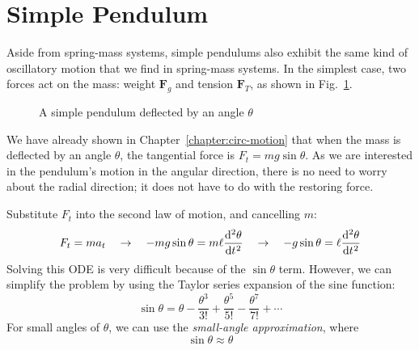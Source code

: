 \section{Simple Pendulum}
Aside from spring-mass systems, simple pendulums also exhibit the same kind
of oscillatory motion that we find in spring-mass systems. In the simplest
case, two forces act on the mass: weight $\bm F_g$ and tension $\bm F_T$, as
shown in Fig.~\ref{fig:pendulum1}.
\begin{figure}[ht]
  \centering 
  \caption{A simple pendulum deflected by an angle $\theta$}
  \label{fig:pendulum1}
\end{figure}
We have already shown in Chapter~\ref{chapter:circ-motion} that when the mass
is deflected by an angle $\theta$, the tangential force is
$F_t=mg\sin\theta$. As we are interested in the pendulum's motion in the
angular direction, there is no need to worry about the radial direction; it
does not have to do with the restoring force.

Substitute $F_t$ into the second law of motion, and cancelling $m$:
\begin{equation}
  F_t=ma_t\quad\rightarrow\quad
  -mg\sin\theta=m\ell\diff[2]{\theta}t
  \quad\rightarrow\quad
  -g\sin\theta=\ell\diff[2]{\theta}t
\end{equation}
Solving this ODE is very difficult because of the $\sin\theta$ term. However,
we can simplify the problem by using the Taylor series expansion of the sine
function:
\begin{equation}
  \sin\theta
  =\theta-\frac{\theta^3}{3!}+\frac{\theta^5}{5!}-\frac{\theta^7}{7!}+\cdots
\end{equation}
For small angles of $\theta$, we can use the \emph{small-angle approximation},
where
\begin{equation}
  \sin\theta\approx\theta
\end{equation}

